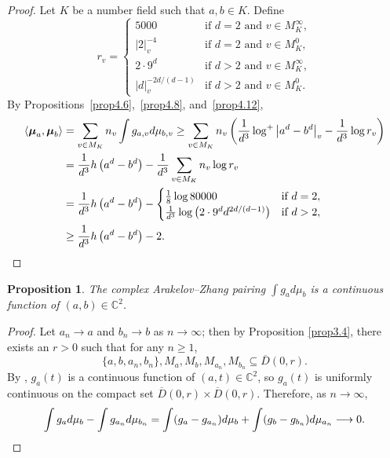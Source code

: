 \documentclass[10pt,a4paper]{amsart}
\numberwithin{equation}{section}
\theoremstyle{plain}
\newtheorem{prop}[thm]{Proposition}
\theoremstyle{definition}
\theoremstyle{remark}
\newcommand{\C}{\mathbb C}
\begin{document}
\begin{proof}
Let $K$ be a number field such that $a,b\in K$. Define
\[
r_{v}=\begin{cases}
5000 & \text{if }d=2\text{ and }v\in M_{K}^{\infty},\\
|2|_{v}^{-4} & \text{if }d=2\text{ and }v\in M_{K}^{0},\\
2\cdot9^{d} & \text{if }d>2\text{ and }v\in M_{K}^{\infty},\\
|d|_{v}^{-2d/(d-1)} & \text{if }d>2\text{ and }v\in M_{K}^{0}.
\end{cases}
\]
By Propositions~\ref{prop4.6},~\ref{prop4.8}, and~\ref{prop4.12},
\allowdisplaybreaks
\begin{align*}
\left\langle \boldsymbol{\mu}_{a},\boldsymbol{\mu}_{b}\right\rangle  & =\sum_{v\in M_{K}}n_{v}\int g_{a,v}d\mu_{b,v}\geq\sum_{v\in M_{K}}n_{v}\left(\frac{1}{d^{3}}\log^{+}\left|a^{d}-b^{d}\right|_{v}-\frac{1}{d^{3}}\log r_{v}\right)\\
 & =\frac{1}{d^{3}}h\left(a^{d}-b^{d}\right)-\frac{1}{d^{3}}\sum_{v\in M_{K}}n_{v}\log r_{v}\\
& =\frac{1}{d^{3}}h\left(a^{d}-b^{d}\right)-
\begin{cases}
\frac{1}{8}\log80000 & \text{if }d=2,\\
\frac{1}{d^{3}}\log\left(2\cdot9^{d}d^{2d/(d-1)}\right) & \text{if }d>2,
\end{cases}\\
 & \geq\frac{1}{d^{3}}h\left(a^{d}-b^{d}\right)-2.\qedhere
\end{align*}
\end{proof}

\begin{prop}\label{prop4.14}
The complex Arakelov--Zhang pairing $\int g_{a}d\mu_{b}$
is a continuous function of $(a,b)\in\C^{2}$.
\end{prop}

\begin{proof}
Let $a_{n}\to a$ and $b_{n}\to b$ as $n\to\infty$; then by Proposition
\ref{prop3.4}, there exists an $r>0$ such that for any $n\geq1$,
\[
\{a,b,a_{n},b_{n}\},M_{a},M_{b},M_{a_{n}},M_{b_{n}}\subseteq\overline{D}(0,r).
\]
By \cite[Proposition 1.2]{BH}, $g_{a}(t)$ is a continuous function
of $(a,t)\in\C^{2}$, so $g_{a}(t)$ is uniformly continuous
on the compact set $\overline{D}(0,r)\times\overline{D}(0,r)$. Therefore,
as $n\to\infty$,
\[
\int g_{a}d\mu_{b}-\int g_{a_{n}}d\mu_{b_{n}}=\int(g_{a}-g_{a_{n}})d\mu_{b}+\int(g_{b}-g_{b_{n}})d\mu_{a_{n}}\longrightarrow 0.\qedhere
\]
\end{proof}
\end{document}
